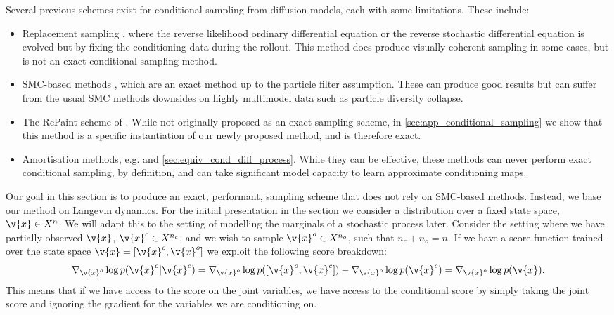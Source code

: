 Several previous schemes exist for conditional sampling from diffusion models, each with some limitations.
These include: \begin{itemize} \item Replacement sampling \cite{song2020score}, where the reverse likelihood ordinary differential equation or the reverse stochastic differential equation is evolved but by fixing the conditioning data during the rollout.
	      This method does produce visually coherent sampling in some cases, but is not an exact conditional sampling method.
	\item SMC-based methods \cite{trippe2022Diffusion}, which are an exact method up to the particle filter assumption.
	      These can produce good results but can suffer from the usual SMC methods downsides on highly multimodel data such as particle diversity collapse.
	\item The {\textsc RePaint} scheme of \cite{lugmayr2022repaint}.
	      While not originally proposed as an exact sampling scheme, in \cref{sec:app_conditional_sampling} we show that this method is a specific instantiation of our newly proposed method, and is therefore exact.
	\item Amortisation methods, e.g. \textcite{phillips2022spectral} and \cref{sec:equiv_cond_diff_process}.
	      While they can be effective, these methods can never perform exact conditional sampling, by definition, and can take significant model capacity to learn approximate conditioning maps.
\end{itemize}

Our goal in this section is to produce an exact, performant, sampling scheme that does not rely on SMC-based methods.
Instead, we base our method on Langevin dynamics.
For the initial presentation in the section we consider a distribution over a fixed state space, \(\v{x}\in X^n\).
We will adapt this to the setting of modelling the marginals of a stochastic process later.
Consider the setting where we have partially observed \(\v{x}\), \(\v{x}^c \in X^{n_c}\), and we wish to sample \(\v{x}^o\in X^{n_o}\), such that \(n_c + n_o = n\).
If we have a score function trained over the state space \(\v{x} = [\v{x}^c, \v{x}^o]\) we exploit the following score breakdown: \[\nabla_{\v{x}^o} \log p(\v{x}^o|\v{x}^c) = \nabla_{\v{x}^o} \log p([\v{x}^o, \v{x}^c]) - \nabla_{\v{x}^o} \log p(\v{x}^c) = \nabla_{\v{x}^o} \log p(\v{x}).\] This means that if we have access to the score on the joint variables, we have access to the conditional score by simply taking the joint score and ignoring  the gradient for the variables we are conditioning on.

